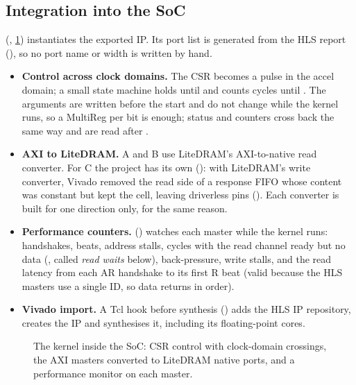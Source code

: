 \subsection{Integration into the SoC}
 (, \cref{fig:integration}) instantiates the exported IP. Its port
list is generated from the HLS report (), so no port name or width is written by hand.
\begin{itemize}
  \item \textbf{Control across clock domains.} The  CSR becomes a pulse in the accel domain; a small
        state machine holds  until  and counts cycles until . The
        arguments are written before the start and do not change while the kernel runs, so a MultiReg per bit is
        enough; status and counters cross back the same way and are read after .
  \item \textbf{AXI to LiteDRAM.} A and B use LiteDRAM's AXI-to-native read converter. For C the project has its own
         (): with LiteDRAM's write converter, Vivado removed the read
        side of a response FIFO whose content was constant but kept the cell, leaving driverless pins
        (). Each converter is built for one direction only, for the same reason.
  \item \textbf{Performance counters.}  () watches each master while
        the kernel runs: handshakes, beats, address stalls, cycles with the read channel ready but no data
        (, called \emph{read waits} below), back-pressure, write stalls, and the read latency
        from each AR handshake to its first R beat (valid because the HLS masters use a single ID, so data returns in
        order).
  \item \textbf{Vivado import.} A Tcl hook before synthesis () adds the HLS IP
        repository, creates the IP and synthesises it, including its floating-point cores.
\end{itemize}

\begin{figure}[t]
  \centering
  \resizebox{\linewidth}{!}{}
  \caption{The kernel inside the SoC: CSR control with clock-domain crossings, the AXI masters converted to LiteDRAM
    native ports, and a performance monitor on each master.}
  \label{fig:integration}
\end{figure}
